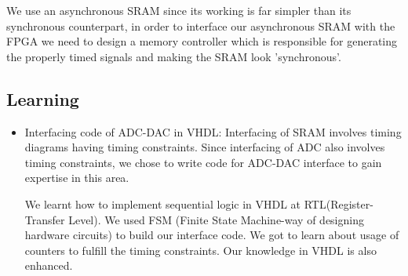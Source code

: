 We use an asynchronous SRAM since its working is far simpler than its synchronous counterpart, in order to interface our asynchronous SRAM with the FPGA we need to design a memory controller which is responsible for generating the properly timed signals and making the SRAM look ’synchronous’.\\


\subsection{Learning}
\begin{itemize}
    \item Interfacing code of ADC-DAC in VHDL: Interfacing of SRAM involves timing diagrams having timing constraints. Since interfacing of ADC also involves timing constraints, we chose to write code for ADC-DAC interface to gain expertise in this area.
    
    We learnt how to implement sequential logic in VHDL at RTL(Register-Transfer Level). We used FSM (Finite State Machine-way of designing hardware circuits) to build our interface code. We got to learn about usage of counters to fulfill the timing constraints. Our knowledge in VHDL is also enhanced.\\ 
\end{itemize}